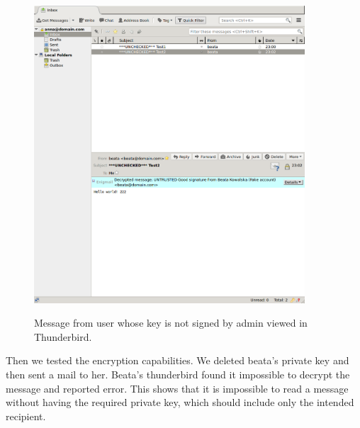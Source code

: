\documentclass{classrep}
\begin{document}
\begin{figure}[H]
\centering
    \includegraphics[width=0.9\textwidth]{images/nonrepudiation-fail.png}
    \label{fig:nonrepudiation-fail}
    \caption{Message from user whose key is not signed by admin viewed in Thunderbird.}
\end{figure}

Then we tested the encryption capabilities. We deleted beata's private key and then sent
a mail to her. Beata's thunderbird found it impossible to decrypt the message and
reported error. This shows that it is impossible to read a message without having the
required private key, which should include only the intended recipient.
\end{document}
